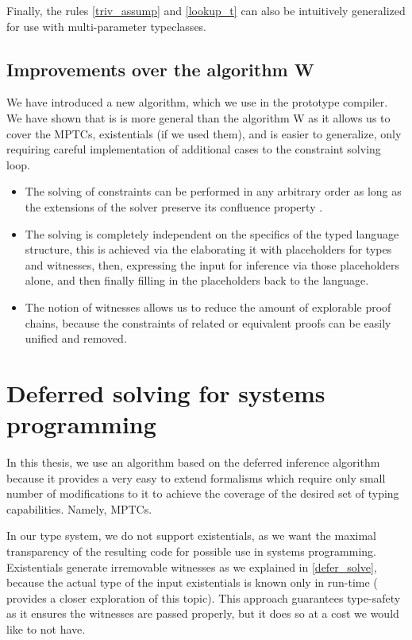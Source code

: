 Finally, the rules \ref{triv_assump} and \ref{lookup_t} can also be intuitively generalized for use with multi-parameter typeclasses.

\subsection{Improvements over the algorithm W}

We have introduced a new algorithm, which we use in the prototype compiler. We have shown that is is more general than the algorithm W as it allows us to cover the MPTCs, existentials (if we used them), and is easier to generalize, only requiring careful implementation of additional cases to the constraint solving loop.

\begin{itemize}
    \item  The solving of constraints can be performed in any arbitrary order as long as the extensions of the solver preserve its confluence property \cite{vytiniotis2011outsidein}.

    \item The solving is completely independent on the specifics of the typed language structure, this is achieved via the elaborating it with placeholders for types and witnesses, then, expressing the input for inference via those placeholders alone, and then finally filling in the placeholders back to the language.

    \item The notion of witnesses allows us to reduce the amount of explorable proof chains, because the constraints of related or equivalent proofs can be easily unified and removed.
\end{itemize}

\section{Deferred solving for systems programming}
\label{sys_defer}

In this thesis, we use an algorithm based on the deferred inference algorithm because it provides a very easy to extend formalisms which require only small number of modifications to it to achieve the coverage of the desired set of typing capabilities. Namely, MPTCs.

In our type system, we do not support existentials, as we want the maximal transparency of the resulting code for possible use in systems programming. Existentials generate irremovable witnesses as we explained in \cref{defer_solve}, because the actual type of the input existentials is known only in run-time (\citet{grossman2002existential} provides a closer exploration of this topic). This approach guarantees type-safety as it ensures the witnesses are passed properly, but it does so at a cost we would like to not have.

